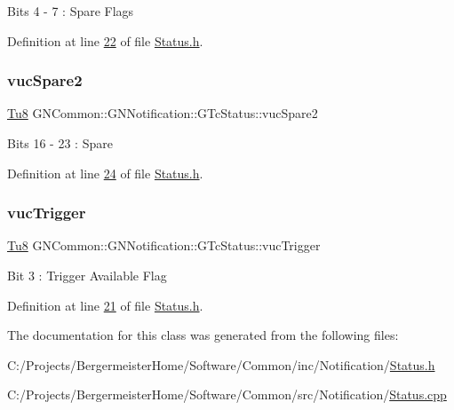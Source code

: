 Bits 4 -\/ 7 \+: Spare Flags 

Definition at line \mbox{\hyperlink{_status_8h_source_l00022}{22}} of file \mbox{\hyperlink{_status_8h_source}{Status.\+h}}.

\mbox{\label{class_g_n_common_1_1_g_n_notification_1_1_g_tc_status_a3464029dd6127d52b8f71d92fbc134a1}} 
\subsubsection{\texorpdfstring{vuc\+Spare2}{vucSpare2}}
{\footnotesize\ttfamily \mbox{\hyperlink{namespace_g_n_common_a7939e251ddbf5d3a31832dcfdc8bde39}{Tu8}} G\+N\+Common\+::\+G\+N\+Notification\+::\+G\+Tc\+Status\+::vuc\+Spare2}

Bits 16 -\/ 23 \+: Spare 

Definition at line \mbox{\hyperlink{_status_8h_source_l00024}{24}} of file \mbox{\hyperlink{_status_8h_source}{Status.\+h}}.

\mbox{\label{class_g_n_common_1_1_g_n_notification_1_1_g_tc_status_a6d02e274c66e3d95f004a2c54026fea1}} 
\subsubsection{\texorpdfstring{vuc\+Trigger}{vucTrigger}}
{\footnotesize\ttfamily \mbox{\hyperlink{namespace_g_n_common_a7939e251ddbf5d3a31832dcfdc8bde39}{Tu8}} G\+N\+Common\+::\+G\+N\+Notification\+::\+G\+Tc\+Status\+::vuc\+Trigger}

Bit 3 \+: Trigger Available Flag 

Definition at line \mbox{\hyperlink{_status_8h_source_l00021}{21}} of file \mbox{\hyperlink{_status_8h_source}{Status.\+h}}.



The documentation for this class was generated from the following files\+:\begin{DoxyCompactItemize}
\item 
C\+:/\+Projects/\+Bergermeister\+Home/\+Software/\+Common/inc/\+Notification/\mbox{\hyperlink{_status_8h}{Status.\+h}}\item 
C\+:/\+Projects/\+Bergermeister\+Home/\+Software/\+Common/src/\+Notification/\mbox{\hyperlink{_status_8cpp}{Status.\+cpp}}\end{DoxyCompactItemize}
